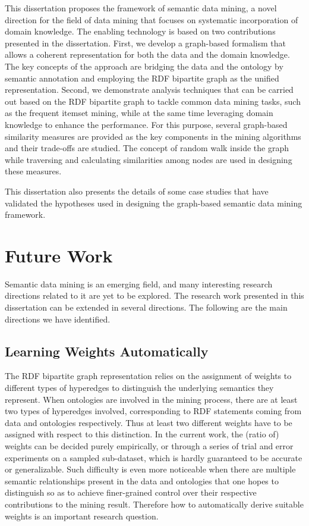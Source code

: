 This dissertation proposes the framework of semantic data mining, a novel direction for the field of data mining that focuses on systematic incorporation of domain knowledge. The enabling technology is based on two contributions presented in the dissertation. First, we develop a graph-based formalism that allows a coherent representation for both the data and the domain knowledge. The key concepts of the approach are bridging the data and the ontology by semantic annotation and employing the RDF bipartite graph as the unified representation. Second, we demonstrate analysis techniques that can be carried out based on the RDF bipartite graph to tackle common data mining tasks, such as the frequent itemset mining, while at the same time leveraging domain knowledge to enhance the performance. For this purpose, several graph-based similarity measures are provided as the key components in the mining algorithms and their trade-offs are studied. The concept of random walk inside the graph while traversing and calculating similarities among nodes are used in designing these measures.

This dissertation also presents the details of some case studies that have validated the hypotheses used in designing the graph-based semantic data mining framework.

\section{Future Work}
Semantic data mining is an emerging field, and many interesting research directions related to it are yet to be explored. The research work presented in this dissertation can be extended in several directions. The following are the main directions we have identified.

\subsection{Learning Weights Automatically}
The RDF bipartite graph representation relies on the assignment of weights to different types of hyperedges to distinguish the underlying semantics they represent. When ontologies are involved in the mining process, there are at least two types of hyperedges involved, corresponding to RDF statements coming from data and ontologies respectively. Thus at least two different weights have to be assigned with respect to this distinction. In the current work, the (ratio of) weights can be decided purely empirically, or through a series of trial and error experiments on a sampled sub-dataset, which is hardly guaranteed to be accurate or generalizable. Such difficulty is even more noticeable when there are multiple semantic relationships present in the data and ontologies that one hopes to distinguish so as to achieve finer-grained control over their respective contributions to the mining result. Therefore how to automatically derive suitable weights is an important research question.

